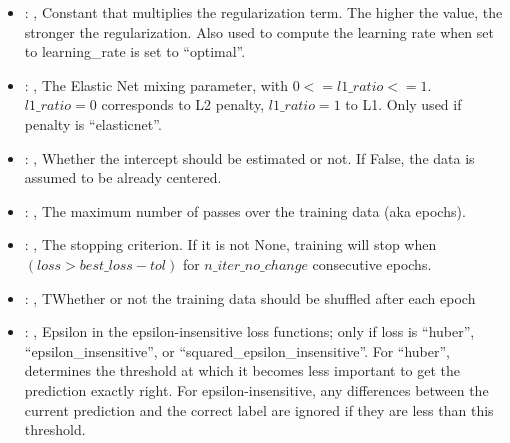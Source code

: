 \begin{itemize}
    \item {}: , 
      Constant that multiplies the regularization term. The higher the value, the stronger the
      regularization. Also used to compute                                                  the
      learning rate when set to learning\_rate is set to ``optimal''.

    \item {}: , 
      The Elastic Net mixing parameter, with $0 <= l1\_ratio <= 1$. $l1\_ratio=0$ corresponds to L2
      penalty, $l1\_ratio=1$ to L1.                                                  Only used if
      penalty is ``elasticnet''.

    \item {}: , 
      Whether the intercept should be estimated or not. If False,
      the data is assumed to be already centered.

    \item {}: , 
      The maximum number of passes over the training data (aka epochs).

    \item {}: , 
      The stopping criterion. If it is not None, training will stop when $(loss > best\_loss - tol)$
      for $n\_iter\_no\_change$                                                  consecutive epochs.

    \item {}: , 
      TWhether or not the training data should be shuffled after each epoch

    \item {}: , 
      Epsilon in the epsilon-insensitive loss functions; only if loss is ``huber'',
      ``epsilon\_insensitive'', or
      ``squared\_epsilon\_insensitive''. For ``huber'', determines the threshold at which it becomes
      less important to get the                                                  prediction exactly
      right. For epsilon-insensitive, any differences between the current prediction and the correct
      label                                                  are ignored if they are less than this
      threshold.


\end{itemize}
